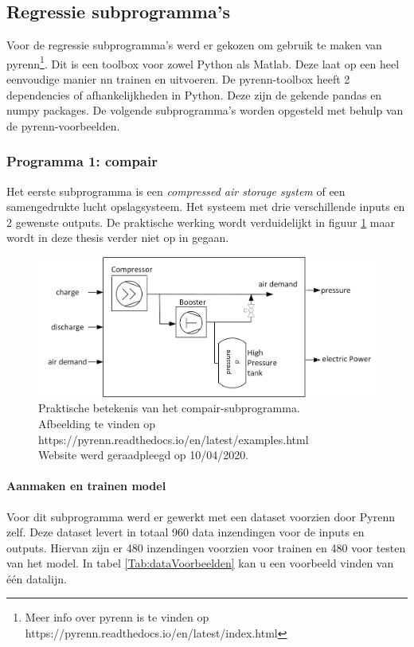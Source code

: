 	\subsection{Regressie subprogramma's}
	Voor de regressie subprogramma's werd er gekozen om gebruik te maken van pyrenn\footnote{Meer info over pyrenn is te vinden op https://pyrenn.readthedocs.io/en/latest/index.html}. Dit is een toolbox voor zowel Python als Matlab. Deze laat op een heel eenvoudige manier \gls{nn} trainen en uitvoeren. De pyrenn-toolbox heeft 2 dependencies of afhankelijkheden in Python. Deze zijn de gekende pandas en numpy packages.  De volgende subprogramma's worden opgesteld met behulp van de pyrenn-voorbeelden. 
		\subsubsection{Programma 1: compair}
		Het eerste subprogramma is een \textit{compressed air storage system} of een samengedrukte lucht opslagsysteem. Het systeem met drie verschillende inputs en 2 gewenste outputs. De praktische werking wordt verduidelijkt in figuur \ref{fig:compairPraktijk} maar wordt in deze thesis verder niet op in gegaan.
			
		\begin{figure}
			\centering
			\includegraphics[width=120mm]{afbeeldingen/compairPraktijk.PNG}
			\caption{Praktische betekenis van het compair-subprogramma. \\Afbeelding te vinden op https://pyrenn.readthedocs.io/en/latest/examples.html\\ Website werd geraadpleegd op 10/04/2020.}
			\label{fig:compairPraktijk}
		\end{figure}
	
			\paragraph{Aanmaken en trainen model}
			Voor dit subprogramma werd er gewerkt met een dataset voorzien door Pyrenn zelf. Deze dataset levert in totaal 960 data inzendingen voor de inputs en outputs. Hiervan zijn er 480 inzendingen voorzien voor trainen en 480 voor testen van het model. In tabel \ref{Tab:dataVoorbeelden} kan u een voorbeeld vinden van \'e\'en datalijn.
			
